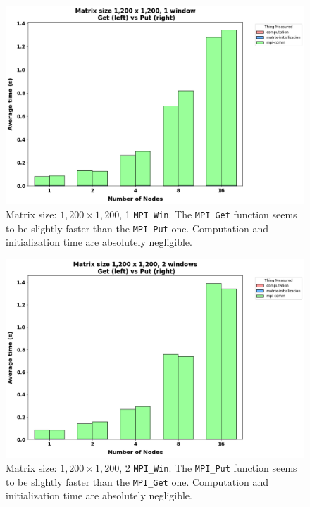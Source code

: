 \documentclass{article}
\begin{document}
    \begin{figure}
        \includegraphics[width=\textwidth]{./images/getvsput-1win-1200}
        \caption{Matrix size: $1,200 \times 1,200$, 1 \texttt{MPI\_Win}. The \texttt{MPI\_Get} function seems to be slightly faster than the \texttt{MPI\_Put} one. Computation and initialization time are absolutely negligible.}
        \label{fig:figure1}
    \end{figure}

    \begin{figure}
        \includegraphics[width=\textwidth]{./images/getvsput-2win-1200}
        \caption{Matrix size: $1,200 \times 1,200$, 2 \texttt{MPI\_Win}. The \texttt{MPI\_Put} function seems to be slightly faster than the \texttt{MPI\_Get} one. Computation and initialization time are absolutely negligible.}
        \label{fig:figure2}
    \end{figure}
\end{document}
